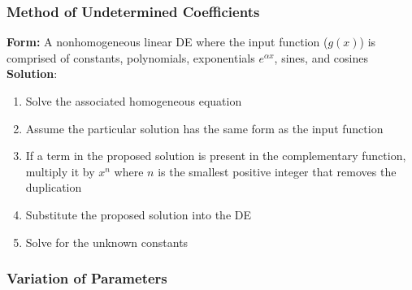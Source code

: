 \documentclass{article}
\begin{document}
\subsubsection{Method of Undetermined Coefficients}

\textbf{Form:} A nonhomogeneous linear DE where the input function ($g(x)$) is comprised of constants, polynomials, exponentials $e^{\alpha x}$, sines, and cosines \\ \textbf{Solution}: \begin{enumerate}
  \item Solve the associated homogeneous equation

  \item Assume the particular solution has the same form as the input function

  \item If a term in the proposed solution is present in the complementary function, multiply it by $x^n$ where $n$ is the smallest positive integer that removes the duplication

  \item Substitute the proposed solution into the DE

  \item Solve for the unknown constants
\end{enumerate}

\subsubsection{Variation of Parameters}
\end{document}
